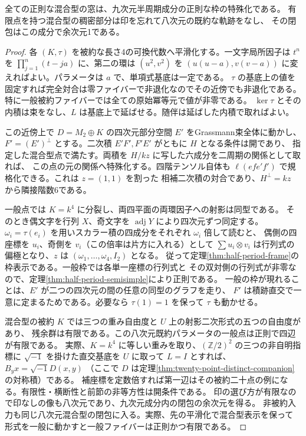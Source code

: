 \begin{theorem}\label{thm:mixed-half-period-specialization}
全ての正則な混合型の窓は、九次元半周期成分の正則な枠の特殊化である。
有限点を持つ混合型の稠密部分は印を忘れて八次元の既約な軌跡をなし、
その閉包はこの成分で余次元1である。
\end{theorem}
\begin{proof}
各 $(K,\tau)$ を被約な長さ4の可換代数へ平滑化する。一文字局所因子は
$t^n$ を $\prod_{j=1}^n(t-ja)$ に、第二の環は $(u^2,v^2)$ を $(u(u-a),v(v-a))$
に変えればよい。パラメータは $a$ で、単項式基底は一定である。
$\tau$ の基底上の値を固定すれば完全対合は零ファイバーで非退化なのでその近傍でも非退化である。
特に一般被約ファイバーでは全ての原始冪等元で値が非零である。
$\ker\tau$ とその内積は束をなし、$L$ は基底上で延ばせる。随伴は延ばした内積で取ればよい。

この近傍上で $D=M_2\oplus K$ の四次元部分空間 $E'$ をGrassmann束全体に動かし、
$F'=(E')^\perp$ とする。二次積 $E'F',F'E'$ がともに $H$ となる条件は開であり、
指定した混合型点で満たす。両積を $H/kz$ に写した六成分を二周期の関係として取れば、
この点の元の関係へ特殊化する。四階テンソル自体も
$\ell(e f e' f')$ で規格化できる。これは $z=(1,1)$ を割った
相補二次積の対合であり、$H^\perp=kz$ から隣接階数6である。

一般点では $K=k^4$ に分裂し、両四平面の両環因子への射影は同型である。
そのとき偶文字を行列 $X$、奇文字を $\operatorname{adj}Y$ により四次元ずつ同定する。
$\omega_i=\tau(e_i)$ を用いスカラー積の四成分をそれぞれ $\omega_i$ 倍して読むと、
偶側の四座標を $u_i$、奇側を $v_i$（この倍率は片方に入れる）として
$\sum u_i\otimes v_i$ は行列式の偏極となり、$z$ は $(\omega_1,\ldots,\omega_4,I_2)$ となる。
従って定理\ref{thm:half-period-frame}の枠表示である。一般枠では各単一座標の行列式と
その双対側の行列式が非零なので、定理\ref{thm:half-period-semisimple}により正則である。
一般の枠が現れることは、$E'$ が二つの四次元の間の任意の同型のグラフを走り、
$F'$ は積跡直交で一意に定まるためである。必要なら $\tau(1)=1$ を保って $\tau$ も動かせる。

混合型の被約 $K$ では三つの重み自由度と $U$ 上の射影二次形式の五つの自由度があり、
残余群は有限である。この八次元既約パラメータの一般点は正則で四辺が有限である。
実際、$K=k^4$ に等しい重みを取り、$(\mathbb Z/2)^2$ の三つの非自明指標に
$\sqrt{-1}$ を掛けた直交基底を $U$ に取って $L=I$ とすれば、$B_yx=\sqrt{-1}D(x,y)$
（ここで $D$ は定理\ref{thm:twenty-point-distinct-companion}の対称積）である。
補座標を定数倍すれば第一辺はその被約二十点の例になる。有限性・横断性と前節の非等方性は開条件である。
印の選び方が有限なので印なしの像も八次元であり、九次元成分内の閉包の余次元を得る。
非被約入力も同じ八次元混合型の閉包に入る。実際、先の平滑化で混合型表示を保って
形式を一般に動かすと一般ファイバーは正則かつ有限である。
\end{proof}
